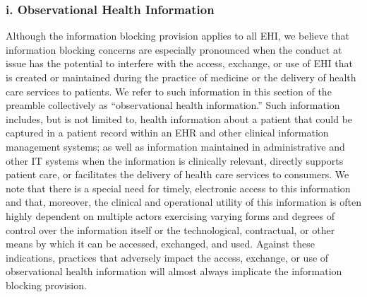 \documentclass[twoside,11pt]{article}
\begin{document}
          \subsubsection{i. Observational Health Information}

          Although the information blocking provision applies to all EHI, we believe that information blocking concerns are especially pronounced when the conduct at issue has the potential to interfere with the access, exchange, or use of EHI that is created or maintained during the practice of medicine or the delivery of health care services to patients. We refer to such information in this section of the preamble collectively as “observational health information.” Such information includes, but is not limited to, health information about a patient that could be captured in a patient record within an EHR and other clinical information management systems; as well as information maintained in administrative and other IT systems when the information is clinically relevant, directly supports patient care, or facilitates the delivery of health care services to consumers. We note that there is a special need for timely, electronic access to this information and that, moreover, the clinical and operational utility of this information is often highly dependent on multiple actors exercising varying forms and degrees of control over the information itself or the technological, contractual, or other means by which it can be accessed, exchanged, and used. Against these indications, practices that adversely impact the access, exchange, or use of observational health information will almost always implicate the information blocking provision.
\end{document}
